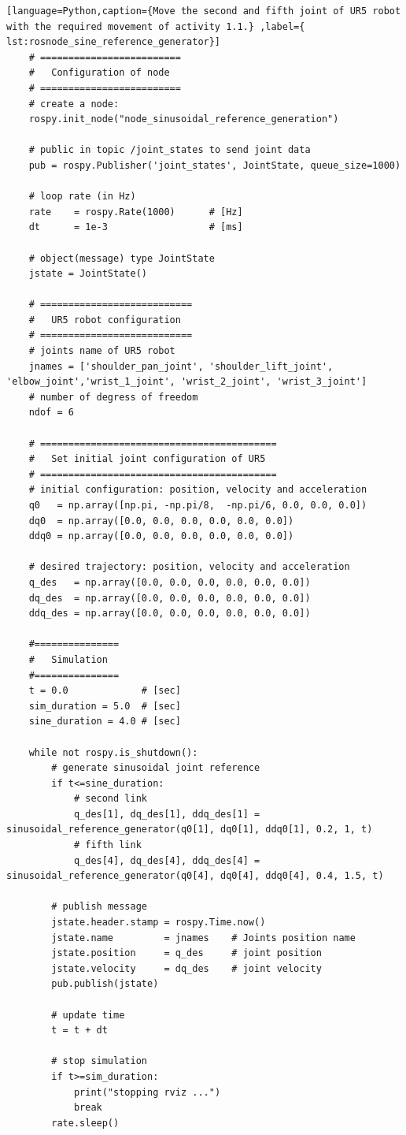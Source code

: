 \begin{lstlisting}[language=Python,caption={Move the second and fifth joint of UR5 robot with the required movement of activity 1.1.} ,label={ lst:rosnode_sine_reference_generator}]
    # =========================
    #   Configuration of node
    # =========================
    # create a node: 
    rospy.init_node("node_sinusoidal_reference_generation")
    
    # public in topic /joint_states	to send joint data	
    pub = rospy.Publisher('joint_states', JointState, queue_size=1000)
    
    # loop rate (in Hz)
    rate 	= rospy.Rate(1000)		# [Hz]
    dt 		= 1e-3					# [ms]
    
    # object(message) type JointState
    jstate = JointState()
    
    # ===========================
    #   UR5 robot configuration
    # ===========================
    # joints name of UR5 robot
    jnames = ['shoulder_pan_joint', 'shoulder_lift_joint', 'elbow_joint','wrist_1_joint', 'wrist_2_joint', 'wrist_3_joint']
    # number of degress of freedom
    ndof = 6
    
    # ==========================================
    #   Set initial joint configuration of UR5
    # ==========================================
    # initial configuration: position, velocity and acceleration 
    q0   = np.array([np.pi, -np.pi/8,  -np.pi/6, 0.0, 0.0, 0.0])
    dq0  = np.array([0.0, 0.0, 0.0, 0.0, 0.0, 0.0])
    ddq0 = np.array([0.0, 0.0, 0.0, 0.0, 0.0, 0.0]) 
    
    # desired trajectory: position, velocity and acceleration
    q_des   = np.array([0.0, 0.0, 0.0, 0.0, 0.0, 0.0]) 
    dq_des  = np.array([0.0, 0.0, 0.0, 0.0, 0.0, 0.0]) 
    ddq_des = np.array([0.0, 0.0, 0.0, 0.0, 0.0, 0.0]) 
    
    #===============
    #   Simulation
    #===============
    t = 0.0             # [sec] 
    sim_duration = 5.0  # [sec]
    sine_duration = 4.0 # [sec]
    
    while not rospy.is_shutdown():
        # generate sinusoidal joint reference
        if t<=sine_duration:
            # second link
            q_des[1], dq_des[1], ddq_des[1] = sinusoidal_reference_generator(q0[1], dq0[1], ddq0[1], 0.2, 1, t)
            # fifth link
            q_des[4], dq_des[4], ddq_des[4] = sinusoidal_reference_generator(q0[4], dq0[4], ddq0[4], 0.4, 1.5, t)
    
        # publish message
        jstate.header.stamp = rospy.Time.now()
        jstate.name 		= jnames    # Joints position name
        jstate.position 	= q_des     # joint position
        jstate.velocity 	= dq_des    # joint velocity
        pub.publish(jstate)
    
        # update time
        t = t + dt

        # stop simulation
        if t>=sim_duration:
            print("stopping rviz ...")
            break  
        rate.sleep()
\end{lstlisting}


